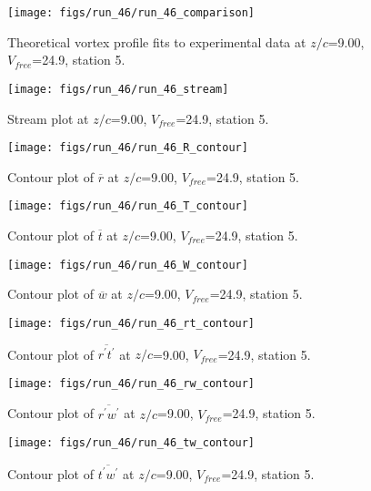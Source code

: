 \begin{figure}[H]
\centering
\texttt{[image: figs/run\_46/run\_46\_comparison]}
\caption{Theoretical vortex profile fits to experimental data at $z/c$=9.00, $V_{free}$=24.9, station 5.}
\label{fig:run_46_comparison}
\end{figure}


\begin{figure}[H]
\centering
\texttt{[image: figs/run\_46/run\_46\_stream]}
\caption{Stream plot at $z/c$=9.00, $V_{free}$=24.9, station 5.}
\label{fig:run_46_stream}
\end{figure}


\begin{figure}[H]
\centering
\texttt{[image: figs/run\_46/run\_46\_R\_contour]}
\caption{Contour plot of $\overline{r}$ at $z/c$=9.00, $V_{free}$=24.9, station 5.}
\label{fig:run_46_R_contour}
\end{figure}


\begin{figure}[H]
\centering
\texttt{[image: figs/run\_46/run\_46\_T\_contour]}
\caption{Contour plot of $\overline{t}$ at $z/c$=9.00, $V_{free}$=24.9, station 5.}
\label{fig:run_46_T_contour}
\end{figure}


\begin{figure}[H]
\centering
\texttt{[image: figs/run\_46/run\_46\_W\_contour]}
\caption{Contour plot of $\overline{w}$ at $z/c$=9.00, $V_{free}$=24.9, station 5.}
\label{fig:run_46_W_contour}
\end{figure}


\begin{figure}[H]
\centering
\texttt{[image: figs/run\_46/run\_46\_rt\_contour]}
\caption{Contour plot of $\overline{r^\prime t^\prime}$ at $z/c$=9.00, $V_{free}$=24.9, station 5.}
\label{fig:run_46_rt_contour}
\end{figure}


\begin{figure}[H]
\centering
\texttt{[image: figs/run\_46/run\_46\_rw\_contour]}
\caption{Contour plot of $\overline{r^\prime w^\prime}$ at $z/c$=9.00, $V_{free}$=24.9, station 5.}
\label{fig:run_46_rw_contour}
\end{figure}


\begin{figure}[H]
\centering
\texttt{[image: figs/run\_46/run\_46\_tw\_contour]}
\caption{Contour plot of $\overline{t^\prime w^\prime}$ at $z/c$=9.00, $V_{free}$=24.9, station 5.}
\label{fig:run_46_tw_contour}
\end{figure}


